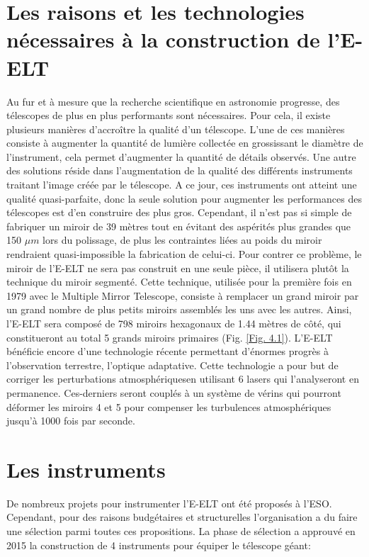 \section{Les raisons et les technologies nécessaires à la construction de l'E-ELT}\label{4.1}

Au fur et à mesure que la recherche scientifique en astronomie progresse, des télescopes de plus en plus performants sont nécessaires. Pour cela, il existe plusieurs manières d'accroître la qualité d'un télescope. L'une de ces manières consiste à augmenter la quantité de lumière collectée en grossissant le diamètre de l'instrument, cela permet d'augmenter la quantité de détails observés. Une autre des solutions réside dans l'augmentation de la qualité des différents instruments traitant l'image créée par le télescope. A ce jour, ces instruments ont atteint une qualité quasi-parfaite, donc la seule solution pour augmenter les performances des télescopes est d'en construire des plus gros. Cependant, il n'est pas si simple de fabriquer un miroir de 39 mètres tout en évitant des aspérités plus grandes que 150 $\mu m$ lors du polissage, de plus les contraintes liées au poids du miroir rendraient quasi-impossible la fabrication de celui-ci. Pour contrer ce problème, le miroir de l'E-ELT ne sera pas construit en une seule pièce, il utilisera plutôt la technique du miroir segmenté. Cette technique, utilisée pour la première fois en 1979 avec le Multiple Mirror Telescope, consiste à remplacer un grand miroir par un grand nombre de plus petits miroirs assemblés les uns avec les autres. Ainsi, l'E-ELT sera composé de 798 miroirs hexagonaux de 1.44 mètres de côté, qui constitueront au total 5 grands miroirs primaires (Fig. \ref{Fig. 4.1}). L'E-ELT bénéficie encore d'une technologie récente permettant d'énormes progrès à l'observation terrestre, l'optique adaptative. Cette technologie a pour but de corriger les perturbations atmosphériques\footnotemark[1] en utilisant 6 lasers qui l'analyseront en permanence. Ces-derniers seront couplés à un système de vérins qui pourront déformer les miroirs 4 et 5 pour compenser les turbulences atmosphériques jusqu'à 1000 fois par seconde.

\section{Les instruments}\label{4.2}

De nombreux projets pour instrumenter l'E-ELT ont été proposés à l'ESO. Cependant, pour des raisons budgétaires et structurelles l'organisation a du faire une sélection parmi toutes ces propositions. La phase de sélection a approuvé en 2015 la construction de 4 instruments pour équiper le télescope géant:

